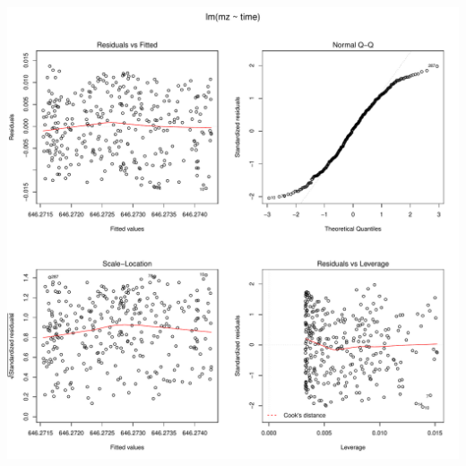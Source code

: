 \documentclass[]{article}
\begin{document}
\includegraphics{Supplementary_document_files/figure-latex/fit.lin.646-1.pdf}
\end{document}
